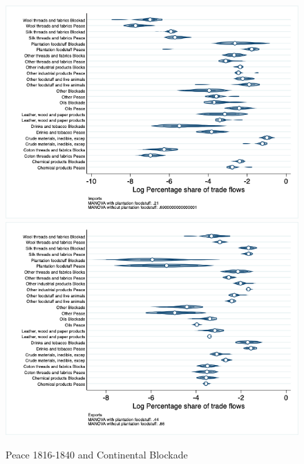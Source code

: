 \documentclass[12pt,a4paper,notitlepage,english]{article}
\begin{document}
\begin{figure}
\centering
\caption{Peace 1816-1840 and Continental Blockade}
\label{peace1816_1840_block_nat_distr}
\includegraphics[scale=.4]{peace1816_1840_block_nat_distr_I}
\includegraphics[scale=.4]{peace1816_1840_block_nat_distr_X}
\end{figure}
\end{document}
